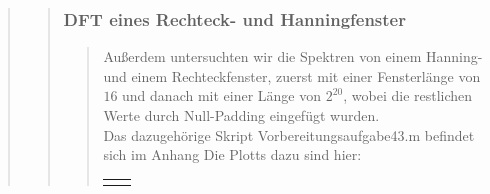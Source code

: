 \begin{quote}
\begin{quote}
\begin{quote}
		\end{quote}

        \subsubsection{DFT eines Rechteck- und Hanningfenster}
		\begin{quote}
            Außerdem untersuchten wir die Spektren von einem Hanning- und einem Rechteckfenster, zuerst mit einer
            Fensterlänge von $16$ und danach mit einer Länge von $2^20$, wobei die restlichen Werte durch Null-Padding
            eingefügt wurden.\\
            Das dazugehörige Skript Vorbereitungsaufgabe43.m befindet sich im Anhang
            Die Plotts dazu sind hier:
            
                \begin{center}
                \begin{tabular}{ll}
    
                \hspace{-11em}
                    \begin{minipage}{0.6\textwidth}
    

\end{minipage}
\end{tabular}
\end{center}
\end{quote}
\end{quote}
\end{quote}
